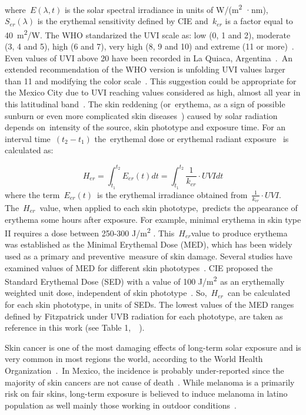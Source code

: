 \documentclass{article}
\begin{document}
where\emph{~\(E\left(\lambda,t\right)\)} is the solar spectral irradiance in
units of W/(m\textsuperscript{2} ·nm),~\emph{~\(S_{er}\left(\lambda\right)\)} is the
erythemal sensitivity defined by CIE and~\(k_{er}\) is a factor
equal to 40~m\textsuperscript{2}/W. The WHO standarized the UVI scale
as: low (0, 1 and 2), moderate (3, 4 and 5), high (6 and 7), very high
(8, 9 and 10) and extreme (11 or more)~\cite{2002}. Even values
of UVI above 20 have been recorded in La Quiaca,
Argentina~\cite{Cede_2002}.~An extended recommendation of the WHO
version is unfolding UVI values larger than 11 and modifying the color
scale~\cite{Zaratti_2014}. This suggestion could be appropriate for the
Mexico City due to UVI reaching values considered as high, almost all
year in this latitudinal band~\cite{Tanskanen_2006,Herman_2010}. The skin reddening
(or~erythema, as a sign of possible sunburn or even more complicated
skin diseases~\cite{kukita1974}) caused by solar radiation depends
on~intensity of the source, skin phototype and exposure time. For an
interval time~\((t_2-t_1)\) the~erythemal dose or erythemal radiant
exposure~\cite{Braslavsky_2007} is calculated as:

\begin{equation}
    H_{er}=\int_{t_{1}}^{t_{2}}{E_{er}(t)} dt=\int_{t_{1}}^{t_{2}}{\frac{1}{k_{er}}\cdot UVI} dt
\end{equation}
where the term~\(E_{er}(t)\)~is
the erythemal irradiance obtained from~\(\frac{1}{k_{er}}\cdot UVI\).
The~\(H_{er}\)~value, when applied to each skin
phototype,~predicts the appearance of erythema some hours after
exposure. For example, minimal erythema in skin type II requires a dose
between 250-300 J/m\textsuperscript{2} \cite{Fitzpatrick1988,Molina_2010,Perez2014,Serrano_2017,Lehmann_2019}.
This~\(H_{er}\)value to produce erythema was established as the
Minimal Erythemal Dose (MED), which has been widely used as a primary
and preventive~measure of skin damage. Several studies have examined
values of MED for different skin phototypes~\cite{MacKie_2000,Meinhardt2008,Miller2012}. CIE
proposed the Standard Erythemal Dose (SED) with a value of 100
J/m\textsuperscript{2~}as an erythemally weighted unit dose, independent
of skin phototype~\cite{organization2014}. So,~\(H_{er}\)~can be
calculated for each skin phototype, in units of SEDs. The lowest values
of the MED ranges defined by Fitzpatrick under UVB radiation for each
phototype, are taken as reference in this work (see Table
1,~~\cite{Fitzpatrick1988}).

Skin cancer is one of the most damaging effects of long-term solar
exposure and is very common in most regions the world, according to the
World Health Organization~\cite{2002}.~In Mexico, the incidence
is probably under-reported since the majority of skin cancers are not
cause of death~\cite{jm2011}. While melanoma is a primarily risk on
fair skins, long-term exposure is believed to induce melanoma in latino
population as well mainly those working in outdoor
conditions~\cite{Rouhani_2008}.
\end{document}
